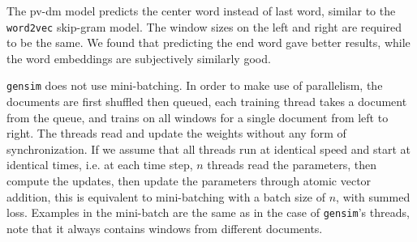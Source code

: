 \documentclass{article}
\begin{document}
\begin{appendices}
The pv-dm model predicts the center word instead of last word, similar to the \texttt{word2vec} skip-gram model. The window sizes on the left and right are required to be the same. We found that predicting the end word gave better results, while the word embeddings are subjectively similarly good.

\texttt{gensim} does not use mini-batching. In order to make use of parallelism, the documents are first shuffled then queued, each training thread takes a document from the queue, and trains on all windows for a single document from left to right. The threads read and update the weights without any form of synchronization. If we assume that all threads run at identical speed and start at identical times, i.e. at each time step, $n$ threads read the parameters, then compute the updates, then update the parameters through atomic vector addition, this is equivalent to mini-batching with a batch size of $n$, with summed loss. Examples in the mini-batch are the same as in the case of \texttt{gensim}'s threads, note that it always contains windows from different documents.

\end{appendices}

{}

\end{document}
